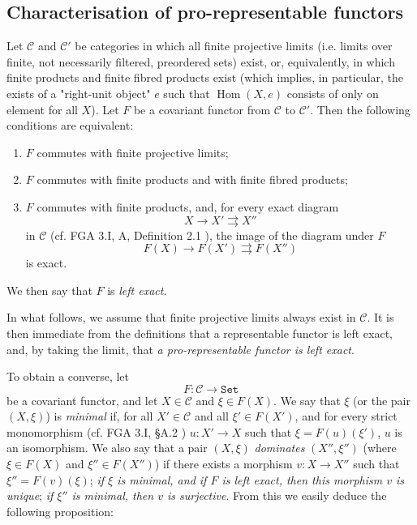 \subsection{Characterisation of pro-representable functors}\label{fga3.ii-a.3}

Let $\mathcal{C}$ and $\mathcal{C}'$ be categories in which all finite projective limits (i.e. limits over finite, not necessarily filtered, preordered sets) exist, or, equivalently, in which finite products and finite fibred products exist (which implies, in particular, the exists of a "right-unit object" $e$ such that $\operatorname{Hom}(X,e)$ consists of only on element for all $X$).
Let $F$ be a covariant functor from $\mathcal{C}$ to $\mathcal{C}'$.
Then the following conditions are equivalent:

\begin{enumerate}[i]
    \item $F$ commutes with finite projective limits;
    \item $F$ commutes with finite products and with finite fibred products;
    \item $F$ commutes with finite products, and, for every exact diagram
          \[
              X\to X'\rightrightarrows X''
          \]
          in $\mathcal{C}$ (cf. FGA 3.I, A, Definition 2.1 ), the image of the diagram under $F$
          \[
              F(X)\to F(X')\rightrightarrows F(X'')
          \]
          is exact.
\end{enumerate}

We then say that $F$ is \emph{left exact}.

In what follows, we assume that finite projective limits always exist in $\mathcal{C}$.
It is then immediate from the definitions that a representable functor is left exact, and, by taking the limit, that \emph{a pro-representable functor is left exact}.

To obtain a converse, let
\[
    F\colon \mathcal{C} \to \mathtt{Set}
\]
be a covariant functor, and let $X\in\mathcal{C}$ and $\xi\in F(X)$.
We say that $\xi$ (or the pair $(X,\xi)$) is \emph{minimal} if, for all $X'\in\mathcal{C}$ and all $\xi'\in F(X')$, and for every strict monomorphism (cf. FGA 3.I, §A.2 ) $u\colon X'\to X$ such that $\xi=F(u)(\xi')$, $u$ is an isomorphism.
We also say that a pair $(X,\xi)$ \emph{dominates} $(X'',\xi'')$ (where $\xi\in F(X)$ and $\xi''\in F(X'')$) if there exists a morphism $v\colon X\to X''$ such that $\xi''=F(v)(\xi)$;
\emph{if $\xi$ is minimal, and if $F$ is left exact, then this morphism $v$ is unique};
\emph{if $\xi''$ is minimal, then $v$ is surjective}.
From this we easily deduce the following proposition:

